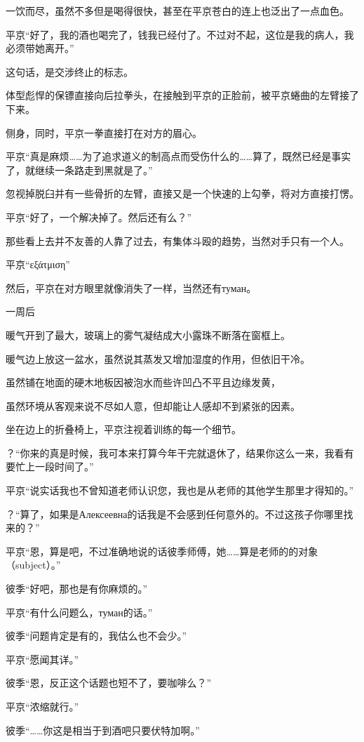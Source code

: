 \documentclass{article}
\begin{document}
一饮而尽，虽然不多但是喝得很快，甚至在平京苍白的连上也泛出了一点血色。

平京“好了，我的酒也喝完了，钱我已经付了。不过对不起，这位是我的病人，我必须带她离开。”

这句话，是交涉终止的标志。

体型彪悍的保镖直接向后拉拳头，在接触到平京的正脸前，被平京蜷曲的左臂接了下来。

侧身，同时，平京一拳直接打在对方的眉心。

平京“真是麻烦……为了追求道义的制高点而受伤什么的……算了，既然已经是事实了，就继续一条路走到黑就是了。”

忽视掉脱臼并有一些骨折的左臂，直接又是一个快速的上勾拳，将对方直接打愣。

平京“好了，一个解决掉了。然后还有么？”

那些看上去并不友善的人靠了过去，有集体斗殴的趋势，当然对手只有一个人。

平京“εξάτμιση”

然后，平京在对方眼里就像消失了一样，当然还有туман。

\centerline{一周后}

暖气开到了最大，玻璃上的雾气凝结成大小露珠不断落在窗框上。

暖气边上放这一盆水，虽然说其蒸发又增加湿度的作用，但依旧干冷。

虽然铺在地面的硬木地板因被泡水而些许凹凸不平且边缘发黄，

虽然环境从客观来说不尽如人意，但却能让人感却不到紧张的因素。

坐在边上的折叠椅上，平京注视着训练的每一个细节。

？“你来的真是时候，我可本来打算今年干完就退休了，结果你这么一来，我看有要忙上一段时间了。”

平京“说实话我也不曾知道老师认识您，我也是从老师的其他学生那里才得知的。”

？“算了，如果是Алексеевна的话我是不会感到任何意外的。不过这孩子你哪里找来的？”

平京“恩，算是吧，不过准确地说的话彼季师傅，她……算是老师的的对象（subject）。”

彼季“好吧，那也是有你麻烦的。”

平京“有什么问题么，туман的话。”

彼季“问题肯定是有的，我估么也不会少。”

平京“愿闻其详。”

彼季“恩，反正这个话题也短不了，要咖啡么？”

平京“浓缩就行。”

彼季“……你这是相当于到酒吧只要伏特加啊。”
\end{document}
